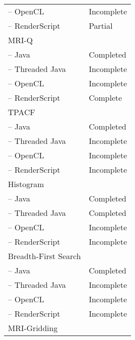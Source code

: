 \begin{table}[h]
\begin{tabular}{ | l | p{2cm} |}
    \hspace{0.5cm}-- OpenCL & Incomplete \\
    \hspace{0.5cm}-- RenderScript & Partial \\ \hline
    MRI-Q & \\
    \hspace{0.5cm}-- Java & Completed \\
    \hspace{0.5cm}-- Threaded Java & Incomplete \\
    \hspace{0.5cm}-- OpenCL & Incomplete \\
    \hspace{0.5cm}-- RenderScript & Complete \\ \hline
    TPACF & \\
    \hspace{0.5cm}-- Java & Completed \\
    \hspace{0.5cm}-- Threaded Java & Incomplete \\
    \hspace{0.5cm}-- OpenCL & Incomplete \\
    \hspace{0.5cm}-- RenderScript & Incomplete \\ \hline
    Histogram & \\
    \hspace{0.5cm}-- Java & Completed \\
    \hspace{0.5cm}-- Threaded Java & Completed \\
    \hspace{0.5cm}-- OpenCL & Incomplete \\
    \hspace{0.5cm}-- RenderScript & Incomplete \\ \hline
    Breadth-First Search & \\
    \hspace{0.5cm}-- Java & Completed \\
    \hspace{0.5cm}-- Threaded Java & Incomplete \\
    \hspace{0.5cm}-- OpenCL & Incomplete \\
    \hspace{0.5cm}-- RenderScript & Incomplete \\ \hline
    MRI-Gridding & \\

\end{tabular}
\end{table}
